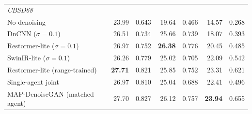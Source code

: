 \begin{table}[!t]
\begin{tabular}{lrrrrrr}
\midrule
\multicolumn{7}{l}{\textit{CBSD68}} \\
No denoising & 23.99 & 0.643 & 19.64 & 0.466 & 14.57 & 0.268 \\
DnCNN ($\sigma{=}0.1$) & 26.51 & 0.734 & 25.66 & 0.739 & 18.07 & 0.393 \\
Restormer-lite ($\sigma{=}0.1$) & 26.97 & 0.752 & \textbf{26.38} & 0.776 & 20.45 & 0.485 \\
SwinIR-lite ($\sigma{=}0.1$) & 26.26 & 0.779 & 25.02 & 0.705 & 22.09 & 0.542 \\
Restormer-lite (range-trained) & \textbf{27.71} & 0.821 & 25.85 & 0.752 & 23.31 & 0.621 \\
Single-agent joint & 26.97 & 0.810 & 25.04 & 0.688 & 22.41 & 0.496 \\
MAP-DenoiseGAN (matched agent) & 27.70 & 0.827 & 26.12 & 0.757 & \textbf{23.94} & 0.655 \\
\bottomrule
\end{tabular}
\end{table}

